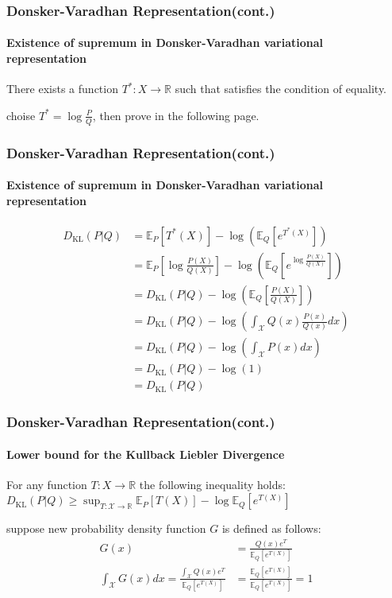 \documentclass[aspectratio=169]{beamer}
\begin{document}
	\begin{frame}
		\frametitle{Donsker-Varadhan Representation(cont.)}
		\framesubtitle{Existence of supremum in Donsker-Varadhan variational representation}
		\begin{lemma}
			There exists a function $T^*: X \rightarrow \mathbb{R}$ such that satisfies the condition of equality.
		\end{lemma}
		choise $T^* = \log\frac{P}{Q}$, then prove in the following page.
	\end{frame}


	\begin{frame}
		\frametitle{Donsker-Varadhan Representation(cont.)}
		\framesubtitle{Existence of supremum in Donsker-Varadhan variational representation}
		\begin{align}
			D_{\text{KL}}(P|Q) &= \mathbb{E}_P[T^*(X)] - \log(\mathbb{E}_Q[e^{T^*(X)}])\\			
			&= \mathbb{E}_P [\log \frac{P(X)}{Q(X)}]-\log(\mathbb{E}_Q[e^{\log\frac{P(X)}{Q(X)}}])\\
			&= D_{\text{KL}}(P|Q) - \log(\mathbb{E}_Q[\frac{P(X)}{Q(X)}])\\
			&= D_{\text{KL}}(P|Q) - \log(\int_{\mathcal{X}} Q(x)\frac{P(x)}{Q(x)}dx)\\
			&= D_{\text{KL}}(P|Q) - \log(\int_{\mathcal{X}} P(x)dx)\\
			&= D_{\text{KL}}(P|Q) - \log(1)\\
			&= D_{\text{KL}}(P|Q)
		\end{align}
	\end{frame}

	\begin{frame}
		\frametitle{Donsker-Varadhan Representation(cont.)}
		\framesubtitle{Lower bound for the Kullback Liebler Divergence}
		\begin{lemma}\label{lemma:lower_bound}
			For any function $T:X \rightarrow \mathbb{R}$ the following inequality holds:
			$D_{\text{KL}}(P | Q) \geq \sup_{T: \mathcal{X} \rightarrow \mathbb{R}} {\mathbb{E}_P[T(X)] - \log \mathbb{E}_Q[e^{T(X)}]}$
		\end{lemma}
		suppose new probability density function $G$ is defined as follows:
		\begin{align}
			G(x) &=\frac{Q(x)e^T}{\mathbb{E}_Q[e^{T(X)}]}\\
			\int_{\mathcal{X}} G(x)dx = \frac{\int_{\mathcal{X}} Q(x)e^T}{\mathbb{E}_Q[e^{T(X)}]} 
			&=\frac{\mathbb{E}_Q[e^{T(X)}]}{\mathbb{E}_Q[e^{T(X)}]} = 1 
		\end{align}
	\end{frame}
\end{document}

